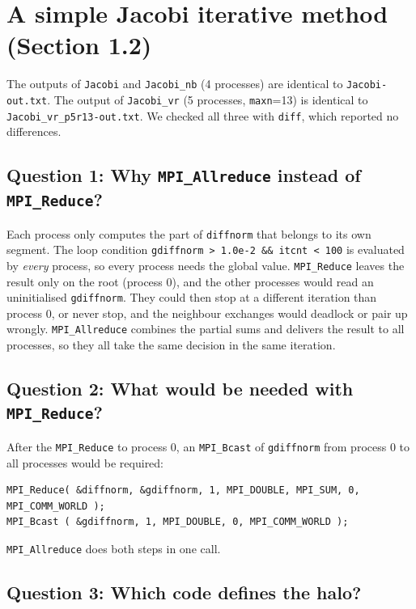 \documentclass[11pt,a4paper]{article}
\begin{document}
\section{A simple Jacobi iterative method (Section 1.2)}

The outputs of \texttt{Jacobi} and \texttt{Jacobi\_nb} (4 processes) are identical to \texttt{Jacobi-out.txt}. The output of \texttt{Jacobi\_vr} (5 processes, \texttt{maxn}=13) is identical to \texttt{Jacobi\_vr\_p5r13-out.txt}. We checked all three with \texttt{diff}, which reported no differences.

\subsection*{Question 1: Why \texttt{MPI\_Allreduce} instead of \texttt{MPI\_Reduce}?}

Each process only computes the part of \texttt{diffnorm} that belongs to its own segment. The loop condition \texttt{gdiffnorm > 1.0e-2 \&\& itcnt < 100} is evaluated by \emph{every} process, so every process needs the global value. \texttt{MPI\_Reduce} leaves the result only on the root (process 0), and the other processes would read an uninitialised \texttt{gdiffnorm}. They could then stop at a different iteration than process 0, or never stop, and the neighbour exchanges would deadlock or pair up wrongly. \texttt{MPI\_Allreduce} combines the partial sums and delivers the result to all processes, so they all take the same decision in the same iteration.

\subsection*{Question 2: What would be needed with \texttt{MPI\_Reduce}?}

After the \texttt{MPI\_Reduce} to process 0, an \texttt{MPI\_Bcast} of \texttt{gdiffnorm} from process 0 to all processes would be required:
\begin{lstlisting}
MPI_Reduce( &diffnorm, &gdiffnorm, 1, MPI_DOUBLE, MPI_SUM, 0, MPI_COMM_WORLD );
MPI_Bcast ( &gdiffnorm, 1, MPI_DOUBLE, 0, MPI_COMM_WORLD );
\end{lstlisting}
\texttt{MPI\_Allreduce} does both steps in one call.

\subsection*{Question 3: Which code defines the halo?}
\end{document}
